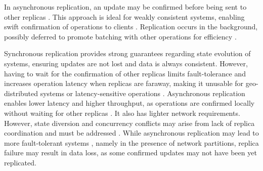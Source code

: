 
In asynchronous replication, an update may be confirmed before being sent to other replicas \cite{epoch}.
This approach is ideal for weakly consistent systems, enabling swift confirmation of operations to clients \cite{cops,cure,sconekv}.
Replication occurs in the background, possibly deferred to promote batching with other operations for efficiency \cite{dynamo, cure}.

Synchronous replication provides strong guarantees regarding state evolution of  systems, ensuring updates are not lost and data is always consistent.
However, having to wait for the confirmation of other replicas 
limits fault-tolerance \cite{spanner,caerus,mdcc,sconekv}
 and increases operation latency when replicas are faraway, making it unusable for geo-distributed systems or latency-sensitive operations \cite{slog,bargain,epoch,walter}. %
Asynchronous replication enables lower latency and higher throughput, as operations are confirmed locally without waiting for other replicas \cite{cure,bargain,cops}. %
It also has lighter network requirements.
However, state diversion and concurrency conflicts may arise from lack of replica coordination
and must be addressed
\cite{dynamo,mdcc,bargain,cops}.
While asynchronous replication may lead to more fault-tolerant systems \cite{dynamo,cassandra,cure}, namely in the presence of network partitions, replica failure may result in data loss, as some confirmed updates may not have been yet replicated. %


